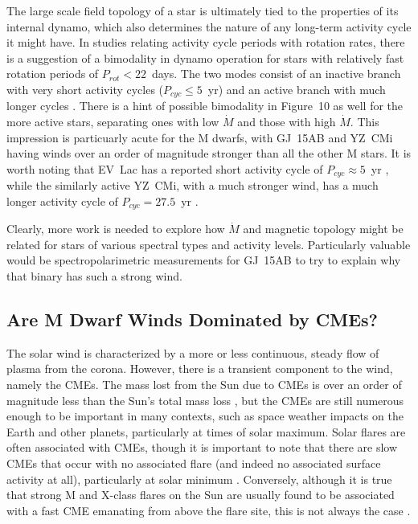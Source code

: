\documentclass[preprint]{aastex}
\begin{document}
     The large scale field topology of a star is ultimately tied to
the properties of its internal dynamo, which also determines the nature
of any long-term activity cycle it might have.  In studies relating
activity cycle periods with rotation rates, there is a suggestion
of a bimodality in dynamo operation for stars with relatively fast
rotation periods of $P_{rot}<22$~days.  The two modes consist
of an inactive branch with very short activity
cycles ($P_{cyc}\leq 5$~yr) and an active branch
with much longer cycles \citep{ab98,tsm16}.
There is a hint of possible bimodality in Figure~10 as well for the
more active stars, separating ones with low $\dot{M}$ and those with
high $\dot{M}$.  This impression is particuarly acute for the M dwarfs,
with GJ~15AB and YZ~CMi having winds over an order of magnitude stronger
than all the other M stars.  It is worth noting that EV~Lac has a
reported short activity cycle of
$P_{cyc}\approx 5$~yr \citep{lnm86}, while the similarly
active YZ~CMi, with a much stronger wind,
has a much longer activity cycle of
$P_{cyc}=27.5$~yr \citep{nib18}.

     Clearly, more work is needed to explore
how $\dot{M}$ and magnetic topology might be
related for stars of various spectral types and activity levels.
Particularly valuable would be spectropolarimetric measurements
for GJ~15AB to try to explain why that binary has such a strong wind.

\subsection{Are M Dwarf Winds Dominated by CMEs?}

     The solar wind is characterized by a more or less continuous, steady
flow of plasma from the corona.  However, there is a transient component
to the wind, namely the CMEs.  The mass lost from the Sun due to CMEs is
over an order of magnitude less than the Sun's total mass loss
\citep{wm19}, but the CMEs
are still numerous enough to be important in many contexts, such as
space weather impacts on the Earth and other planets, particularly at times
of solar maximum.  Solar flares are often associated with CMEs, though it is
important to note that there are slow CMEs that occur with no associated
flare (and indeed no associated surface activity at all), particularly
at solar minimum \citep{bew17}.  Conversely, although it is true
that strong M and X-class flares on the Sun are usually found to be
associated with a fast CME emanating from above the flare site, this
is not always the case \citep{xs15}.
\end{document}
